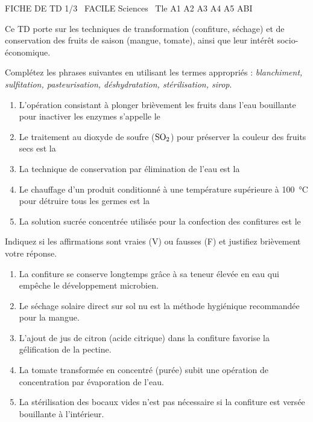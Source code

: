 \documentclass[11pt]{article}
\begin{document}
\begin{tcolorbox}[enhanced,colback=popink,colframe=popink,arc=10pt,boxrule=0pt,left=12pt,right=12pt,top=9pt,bottom=9pt]
{\color{white}\popxbold\small FICHE DE TD 1/3 \textbullet\ FACILE \hfill Sciences \textbullet\ Tle A1 A2 A3 A4 A5 ABI\par}
\end{tcolorbox}
\vspace{4pt}
Ce TD porte sur les techniques de transformation (confiture, séchage) et de conservation des fruits de saison (mangue, tomate), ainsi que leur intérêt socio-économique.

\begin{exercice}
Complétez les phrases suivantes en utilisant les termes appropriés : \textit{blanchiment, sulfitation, pasteurisation, déshydratation, stérilisation, sirop}.
\begin{enumerate}
    \item L'opération consistant à plonger brièvement les fruits dans l'eau bouillante pour inactiver les enzymes s'appelle le \dotfill
    \item Le traitement au dioxyde de soufre ($\ce{SO2}$) pour préserver la couleur des fruits secs est la \dotfill
    \item La technique de conservation par élimination de l'eau est la \dotfill
    \item Le chauffage d'un produit conditionné à une température supérieure à \SI{100}{\celsius} pour détruire tous les germes est la \dotfill
    \item La solution sucrée concentrée utilisée pour la confection des confitures est le \dotfill
\end{enumerate}
\end{exercice}

\begin{exercice}
Indiquez si les affirmations sont vraies (V) ou fausses (F) et justifiez brièvement votre réponse.
\begin{enumerate}
    \item La confiture se conserve longtemps grâce à sa teneur élevée en eau qui empêche le développement microbien.
    \item Le séchage solaire direct sur sol nu est la méthode hygiénique recommandée pour la mangue.
    \item L'ajout de jus de citron (acide citrique) dans la confiture favorise la gélification de la pectine.
    \item La tomate transformée en concentré (purée) subit une opération de concentration par évaporation de l'eau.
    \item La stérilisation des bocaux vides n'est pas nécessaire si la confiture est versée bouillante à l'intérieur.
\end{enumerate}
\end{exercice}
\end{document}

